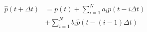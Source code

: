 \begin{equation}
\begin{split}
	\hat{p}(t+\Delta t) &= p(t) + \sum_{i=1}^{N} a_i p(t-i\Delta t)\\
	&+ \sum_{i=1}^{N} b_i \hat{p}(t-(i-1)\Delta t)
\end{split}
\label{ch2:equ:mpc-arx}
\end{equation}
